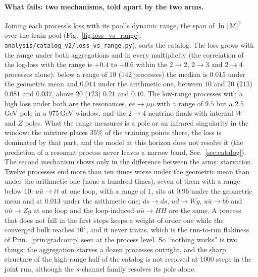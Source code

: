 \documentclass[11pt]{article}
\newcommand{\code}[1]{\texttt{#1}}
\begin{document}
\paragraph{What fails: two mechanisms, told apart by the two arms.} Joining each
process's loss with its pool's dynamic range, the span of $\ln|\mathcal M|^2$ over the
train pool (Fig.~\ref{fig:loss_vs_range}; \code{analysis/catalog\_v2/loss\_vs\_range.py}),
sorts the catalog. The loss grows with the range under both aggregations and in every
multiplicity (the correlation of the log-loss with the range is $+0.4$ to $+0.6$ within the
$2\to2$, $2\to3$ and $2\to4$ processes alone): below a range of $10$ ($142$ processes) the median
is $0.015$ under the geometric mean and $0.014$ under the arithmetic one, between $10$ and $20$
($213$) $0.081$ and $0.037$, above $20$ ($123$) $0.21$ and $0.10$. The low-range processes with a
high loss under both are the resonances, $ee\to\mu\mu$ with a range of $9.5$ but a
$2.5$\,GeV pole in a $975$\,GeV window, and the $2\to4$ neutrino finals with internal $W$
and $Z$ poles. What the range measures is a pole or an infrared singularity in the window:
the mixture places $35\%$ of the training points there, the loss is dominated by that part,
and the model at this horizon does not resolve it (the prediction of a resonant process
never leaves a narrow band, Sec.~\ref{sec:catalog}). The second mechanism shows only in the
difference between the arms: starvation. Twelve processes end more than ten times worse
under the geometric mean than under the arithmetic one (none a hundred times), seven of them
with a range below $10$: $u\bar u\to t\bar t$ at one loop, with a range of $1$, sits at $0.96$
under the geometric mean and at $0.013$ under the arithmetic one; $ds\to ds$, $u\bar d\to Wg$,
$u\bar u\to b\bar b$ and $u\bar u\to Zg$ at one loop and the loop-induced $u\bar u\to HH$ are
the same. A process that does not fall in the first steps keeps a weight of order one while
the converged bulk reaches $10^4$, and it never trains, which is the run-to-run flakiness of
Prin.~\ref{prin:gradcomp} seen at the process level. So ``nothing works'' is two things: the
aggregation starves a dozen processes outright, and the sharp structure of the high-range
half of the catalog is not resolved at $1000$ steps in the joint run, although the $s$-channel
family resolves its pole alone.
\end{document}
